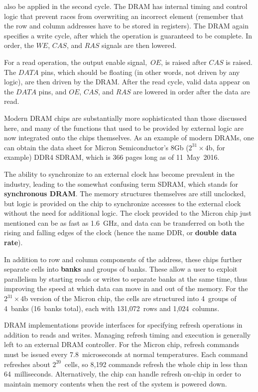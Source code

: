 also be applied in the second cycle.  The DRAM has internal
timing and control logic that prevent races from overwriting an
incorrect element (remember that the row and column addresses have to
be stored in registers).  The DRAM again specifies a write cycle,
after which the operation is guaranteed to be complete.  In order, the
$WE$, $CAS$, and $RAS$ signals are then lowered.  

For a read operation, the output enable signal,~$OE$, is raised after
$CAS$ is raised.  The $DATA$ pins, which should be floating (in other
words, not driven by any logic), are then driven by the DRAM.  After the 
read cycle, valid data appear on the $DATA$ pins, and $OE$, $CAS$, and
$RAS$ are lowered in order after the data are read.

Modern DRAM chips are substantially more sophisticated than those
discussed here, and many of the functions that used to be provided
by external logic are now integrated onto the chips themselves.
%
As an example of modern DRAMs, one can obtain
the data sheet for Micron Semiconductor's 8Gb (\mbox{$2^{31}\times{4}$b},
for example) DDR4 SDRAM, which is 366 pages long as of 11~May~2016.

The ability to synchronize to an external clock has become prevalent in 
the industry, leading to the somewhat confusing term SDRAM, which stands 
for {\bf synchronous DRAM}.  The memory structures themselves
are still unclocked, but logic is provided on the chip to synchronize 
accesses to the external clock without the need for additional 
logic.
%
The clock provided to the Micron chip just mentioned
can be as fast as 1.6~GHz, and data can be
transferred on both the rising and falling edges of the clock
(hence the name DDR, or {\bf double data rate}).  

In addition to row and
column components of the address, these chips further separate cells into
{\bf banks} and groups of banks.  These allow a user to exploit parallelism
by starting reads or writes to separate banks at the same time, thus
improving the speed at which data can move in and out of the memory.
%
For the \mbox{$2^{31}\times{4}$b} version of the Micron chip,
the cells are structured into 4~groups of 4~banks (16~banks total),
each with 131,072~rows and 1,024~columns.  

DRAM implementations provide interfaces for specifying
refresh operations in addition to reads and writes.
Managing refresh timing and execution is
generally left to an external DRAM controller.
%
For the Micron chip, refresh commands must be issued every 
7.8~microseconds at normal temperatures.  Each
command refreshes about $2^{20}$~cells, so 8,192 commands refresh
the whole chip in less than 64~milliseconds.
%
Alternatively, the chip can handle refresh on-chip in
order to maintain memory contents when the rest of the system is 
powered down.

\pagebreak

